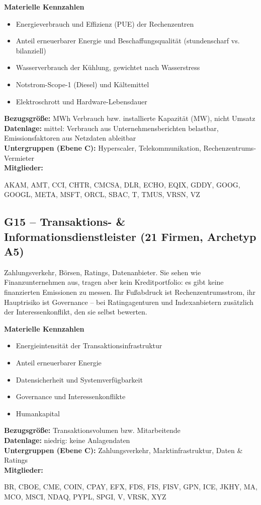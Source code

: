 \noindent\textbf{Materielle Kennzahlen}
\begin{itemize}[nosep,leftmargin=1.2em]
  \item Energieverbrauch und Effizienz (PUE) der Rechenzentren
  \item Anteil erneuerbarer Energie und Beschaffungsqualität (stundenscharf vs. bilanziell)
  \item Wasserverbrauch der Kühlung, gewichtet nach Wasserstress
  \item Notstrom-Scope-1 (Diesel) und Kältemittel
  \item Elektroschrott und Hardware-Lebensdauer
\end{itemize}
\noindent\textbf{Bezugsgröße:} MWh Verbrauch bzw. installierte Kapazität (MW), nicht Umsatz\\
\textbf{Datenlage:} mittel: Verbrauch aus Unternehmensberichten belastbar, Emissionsfaktoren aus Netzdaten ableitbar\\
\textbf{Untergruppen (Ebene C):} Hyperscaler, Telekommunikation, Rechenzentrums-Vermieter\\
\textbf{Mitglieder:} {\raggedright\small\ttfamily AKAM, AMT, CCI, CHTR, CMCSA, DLR, ECHO, EQIX, GDDY, GOOG, GOOGL, META, MSFT, ORCL, SBAC, T, TMUS, VRSN, VZ\par}

\medskip
\subsection*{G15 -- Transaktions- \& Informationsdienstleister \normalfont\small (21 Firmen, Archetyp A5)}
\noindent Zahlungsverkehr, Börsen, Ratings, Datenanbieter. Sie sehen wie Finanzunternehmen aus, tragen aber kein Kreditportfolio: es gibt keine finanzierten Emissionen zu messen. Ihr Fußabdruck ist Rechenzentrumsstrom, ihr Hauptrisiko ist Governance -- bei Ratingagenturen und Indexanbietern zusätzlich der Interessenkonflikt, den sie selbst bewerten.

\noindent\textbf{Materielle Kennzahlen}
\begin{itemize}[nosep,leftmargin=1.2em]
  \item Energieintensität der Transaktionsinfrastruktur
  \item Anteil erneuerbarer Energie
  \item Datensicherheit und Systemverfügbarkeit
  \item Governance und Interessenkonflikte
  \item Humankapital
\end{itemize}
\noindent\textbf{Bezugsgröße:} Transaktionsvolumen bzw. Mitarbeitende\\
\textbf{Datenlage:} niedrig: keine Anlagendaten\\
\textbf{Untergruppen (Ebene C):} Zahlungsverkehr, Marktinfrastruktur, Daten \& Ratings\\
\textbf{Mitglieder:} {\raggedright\small\ttfamily BR, CBOE, CME, COIN, CPAY, EFX, FDS, FIS, FISV, GPN, ICE, JKHY, MA, MCO, MSCI, NDAQ, PYPL, SPGI, V, VRSK, XYZ\par}

